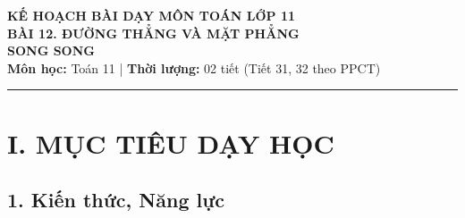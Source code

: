 \documentclass[12pt, a4paper]{article}
\begin{document}
\begin{center}
    {\Large \textbf{KẾ HOẠCH BÀI DẠY MÔN TOÁN LỚP 11}}\\[0.4em]
    {\LARGE \textbf{BÀI 12. ĐƯỜNG THẲNG VÀ MẶT PHẲNG}}\\[0.3em]
    {\LARGE \textbf{SONG SONG}}\\[0.5em]
    \textbf{Môn học:} Toán 11 | \textbf{Thời lượng:} 02 tiết (Tiết 31, 32 theo PPCT)
\end{center}

\vspace{0.5em}
\hrule
\vspace{1em}

\section*{I. MỤC TIÊU DẠY HỌC}

\subsection*{1. Kiến thức, Năng lực}
\end{document}

